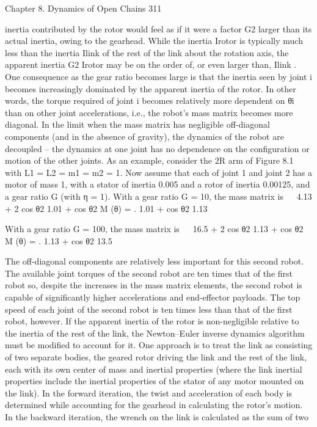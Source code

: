 \documentclass[12pt,a4paper]{article}
\begin{document}
Chapter 8. Dynamics of Open Chains                                                                  311

inertia contributed by the rotor would feel as if it were a factor G2 larger than
its actual inertia, owing to the gearhead.
    While the inertia Irotor is typically much less than the inertia Ilink of the
rest of the link about the rotation axis, the apparent inertia G2 Irotor may be
on the order of, or even larger than, Ilink .
    One consequence as the gear ratio becomes large is that the inertia seen by
joint i becomes increasingly dominated by the apparent inertia of the rotor. In
other words, the torque required of joint i becomes relatively more dependent
on θ̈i than on other joint accelerations, i.e., the robot’s mass matrix becomes
more diagonal. In the limit when the mass matrix has negligible off-diagonal
components (and in the absence of gravity), the dynamics of the robot are
decoupled – the dynamics at one joint has no dependence on the configuration
or motion of the other joints.
    As an example, consider the 2R arm of Figure 8.1 with L1 = L2 = m1 =
m2 = 1. Now assume that each of joint 1 and joint 2 has a motor of mass 1,
with a stator of inertia 0.005 and a rotor of inertia 0.00125, and a gear ratio G
(with η = 1). With a gear ratio G = 10, the mass matrix is
                                                            
                               4.13 + 2 cos θ2 1.01 + cos θ2
                    M (θ) =                                    .
                                1.01 + cos θ2       1.13

    With a gear ratio G = 100, the mass matrix is
                                                         
                            16.5 + 2 cos θ2 1.13 + cos θ2
                  M (θ) =                                   .
                             1.13 + cos θ2      13.5

The off-diagonal components are relatively less important for this second robot.
The available joint torques of the second robot are ten times that of the first
robot so, despite the increases in the mass matrix elements, the second robot is
capable of significantly higher accelerations and end-effector payloads. The top
speed of each joint of the second robot is ten times less than that of the first
robot, however.
    If the apparent inertia of the rotor is non-negligible relative to the inertia
of the rest of the link, the Newton–Euler inverse dynamics algorithm must be
modified to account for it. One approach is to treat the link as consisting of
two separate bodies, the geared rotor driving the link and the rest of the link,
each with its own center of mass and inertial properties (where the link inertial
properties include the inertial properties of the stator of any motor mounted on
the link). In the forward iteration, the twist and acceleration of each body is
determined while accounting for the gearhead in calculating the rotor’s motion.
In the backward iteration, the wrench on the link is calculated as the sum of two
\end{document}
